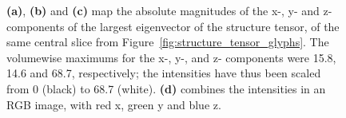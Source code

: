   \begin{figure}[htbp]
    \centering
    \caption{\textbf{(a)}, \textbf{(b)} and \textbf{(c)} map the absolute magnitudes of the x-, y- and z- components of the largest eigenvector of the structure tensor, of the same central slice from Figure~\ref{fig:structure_tensor_glyphs}. The volumewise maximums for the x-, y-, and z- components were 15.8, 14.6 and 68.7, respectively; the intensities have thus been scaled from 0 (black) to 68.7 (white). \textbf{(d)} combines the intensities in an RGB image, with red x, green y and blue z.}
    \label{fig:eigencomponents}
  \end{figure}
  
